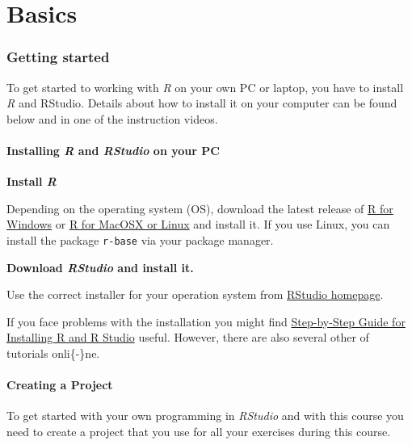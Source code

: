 \documentclass[
]{scrartcl}
\makeatletter
\newenvironment{kframe}{%
\medskip{}
\setlength{\fboxsep}{.8em}
 \def\at@end@of@kframe{}%
 \ifinner\ifhmode%
  \def\at@end@of@kframe{\end{minipage}}%
  \begin{minipage}{\columnwidth}%
 \fi\fi%
 \def\FrameCommand##1{\hskip\@totalleftmargin \hskip-\fboxsep
 \colorbox{shadecolor}{##1}\hskip-\fboxsep
     \hskip-\linewidth \hskip-\@totalleftmargin \hskip\columnwidth}%
 \MakeFramed {\advance\hsize-\width
   \@totalleftmargin\z@ \linewidth\hsize
   \@setminipage}}%
 {\par\unskip\endMakeFramed%
 \at@end@of@kframe}
\newenvironment{rmdblock}[1]
  {
  \begin{itemize}
  \renewcommand{\labelitemi}{
    \raisebox{-.7\height}[0pt][0pt]{
      {\setkeys{Gin}{width=3em,keepaspectratio}\texttt{[image: images/\#1]}}
    }
  }
  \setlength{\fboxsep}{1em}
  \begin{kframe}
  \item
  }
  {
  \end{kframe}
  \end{itemize}
  }
\newenvironment{myexercise}
    {\begin{rmdblock}{exercise_green}}
    {\end{rmdblock}}
\makeatother
\begin{document}
\newpage

\part{Basics}\label{part-basics}

\section{Getting started}\label{gettingstarted}

To get started to working with \emph{R} on your own PC or laptop, you have to install \emph{R} and RStudio. Details about how to install it on your computer can be found below and in one of the instruction videos.

\subsection{\texorpdfstring{Installing \emph{R} and \emph{RStudio} on your PC}{Installing R and RStudio on your PC}}\label{installing-r-and-rstudio-on-your-pc}

\begin{myexercise}
\textbf{Install \emph{R}}

Depending on the operating system (OS), download the latest release of
\href{https://cran.rstudio.com/bin/windows/base/}{R for Windows} or
\href{https://cran.rstudio.com/}{R for MacOSX or Linux} and install it.
If you use Linux, you can install the package \texttt{r-base} via your
package manager.
\end{myexercise}

\begin{myexercise}
\textbf{Download \emph{RStudio} and install it.}

Use the correct installer for your operation system from
\href{https://rstudio.com/products/rstudio/download/\#download}{RStudio
homepage}.
\end{myexercise}

If you face problems with the installation you might find \href{https://techvidvan.com/tutorials/install-r/}{Step-by-Step Guide for Installing R and R Studio} useful. However, there are also several other of tutorials onli\{-\}ne.

\subsection{Creating a Project}\label{creating-a-project}

To get started with your own programming in \emph{RStudio} and with this course you need to create a project that you use for all your exercises during this course.
\end{document}

